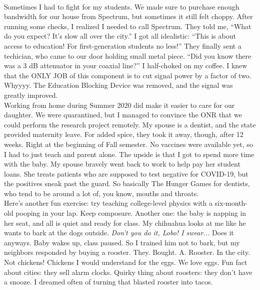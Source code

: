\documentclass[../../main.tex]{subfiles}
\begin{document}
\\
\vspace{0.15cm}
Sometimes I had to fight for my students.  We made sure to purchase enough bandwidth for our house from Spectrum, but sometimes it still felt choppy.  After running some checks, I realized I needed to call Spectrum.  They told me, ``What do you expect?  It's slow all over the city.''  I got all idealistic: ``This is about access to education!  For first-generation students no less!'' They finally sent a techician, who came to our door holding small metal piece.  ``Did you know there was a 3 dB attenuator in your coaxial line?''  I half-choked on my coffee.  I knew that the ONLY JOB of this component is to cut signal power by a factor of two.  Whyyyy.  The Education Blocking Device was removed, and the signal was greatly improved.
\\
\vspace{0.15cm}
Working from home during Summer 2020 did make it easier to care for our daughter.  We were quarantined, but I managed to convince the ONR that we could perform the research project remotely.  My spouse is a dentist, and the state provided maternity leave.  For added spice, they took it away, though, after 12 weeks.  Right at the beginning of Fall semester.  No vaccines were available yet, so I had to just teach and parent alone.  The upside is that I got to spend more time with the baby.  My spouse bravely went back to work to help pay her student loans.  She treats patients who are supposed to test negative for COVID-19, but the positives sneak past the guard.  So basically The Hunger Games for dentists, who tend to be around a lot of, you know, mouths and throats.
\\
\vspace{0.15cm}
Here's another fun exercise: try teaching college-level physics with a six-month-old pooping in your lap.  Keep composure.  Another one: the baby is napping in her seat, and all is quiet and ready for class.  My chihuahua looks at me like he wants to bark at the dogs outside.  \textit{Don't you do it, Lobo!  I swear...} Does it anyways.  Baby wakes up, class paused.  So I trained him not to bark, but my neighbors responded by buying a rooster.  They. Bought. A. Rooster.  In the city.  Not chickens!  Chickens I would understand for the eggs.  We love eggs.  Fun fact about cities: they sell alarm clocks.  Quirky thing about roosters: they don't have a snooze.  I dreamed often of turning that blasted rooster into tacos.
\\
\vspace{0.15cm}
\end{document}
